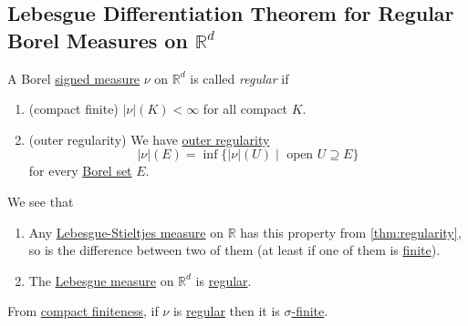 \subsection{Lebesgue Differentiation Theorem for Regular Borel Measures on \(\mathbb{R} ^d\)}
\begin{definition}[Regular]\label{def:regular}
	A Borel \hyperref[def:signed-measure]{signed measure} \(\nu\) on \(\mathbb{R}^d\) is called \emph{regular} if
	\begin{enumerate}
		\item\label{def:regular-compact-finite} (compact finite) \(\left\vert \nu \right\vert(K) < \infty\) for all compact \(K\).
		\item\label{def:regular-outer-regularity} (outer regularity) We have \hyperref[thm:regularity]{outer regularity}
		\[
			\left\vert \nu \right\vert(E) = \inf\{\left\vert \nu \right\vert(U) \mid \text{ open } U \supseteq E\}
		\]
		for every \hyperref[def:Borel-set]{Borel set} \(E\).
	\end{enumerate}
\end{definition}

\begin{eg}
	We see that
	\begin{enumerate}
		\item Any \hyperref[def:Lebesgue-Stieltjes-measure]{Lebesgue-Stieltjes measure} on \(\mathbb{R}\) has this property from \autoref{thm:regularity},
		      so is the difference between two of them (at least if one of them is \hyperref[def:finite-signed-measure]{finite}).
		\item The \hyperref[def:Lebesgue-measure]{Lebesgue measure} on \(\mathbb{R}^d\) is \hyperref[def:regular]{regular}.
	\end{enumerate}
\end{eg}

\begin{note}
	From \hyperref[def:regular-compact-finite]{compact finiteness}, if \(\nu\) is \hyperref[def:regular]{regular} then it is
	\hyperref[def:finite-signed-measure]{\(\sigma\)-finite}.
\end{note}

